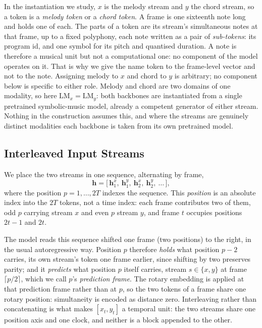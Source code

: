 In the instantiation we study, $x$ is the melody stream and $y$ the
chord stream, so a token is a \emph{melody token} or a \emph{chord
token}. A frame is one sixteenth note long and holds one of each.
The parts of a token are its stream's simultaneous notes at that frame,
up to a fixed polyphony, each note written as a pair of
\emph{sub-tokens}: its program id, and one symbol for its pitch and
quantised duration. A note is
therefore a musical unit but not a computational one: no component of
the model operates on it. That is why we give the name token to the
frame-level vector and not to the note. Assigning melody to $x$ and
chord to $y$ is arbitrary; no component below is specific to either
role. Melody and
chord are two domains of one modality, so here
$\mathrm{LM}_x = \mathrm{LM}_y$: both backbones are instantiated from a
single pretrained symbolic-music model, already a competent generator
of either stream. Nothing in the construction assumes this,
and where the streams are genuinely distinct modalities each backbone
is taken from its own pretrained model.

\subsection{Interleaved Input Streams}
\label{sec:interleave}

We place the two streams in one sequence, alternating by frame,
\begin{equation}
  \mathbf{h}
  = \bigl[\,\mathbf{h}^{x}_1,\ \mathbf{h}^{y}_1,\
            \mathbf{h}^{x}_2,\ \mathbf{h}^{y}_2,\ \dots\,\bigr],
  \label{eq:interleave}
\end{equation}
where the position $p = 1, \dots, 2T$ indexes the sequence. This
\emph{position} is an absolute index into the $2T$ tokens, not a time
index: each frame contributes two of them, odd $p$ carrying stream $x$
and even $p$ stream $y$, and frame $t$ occupies positions $2t{-}1$ and
$2t$.

The model reads this sequence shifted one frame (two positions) to
the right, in the usual autoregressive way. Position $p$ therefore
\emph{holds} what position $p{-}2$ carries, its own stream's token one
frame earlier, since shifting by two preserves parity; and it
\emph{predicts} what position $p$ itself carries, stream
$s \in \{x, y\}$ at frame $\lceil p/2 \rceil$, which we call $p$'s
\emph{prediction frame}. The rotary embedding is applied at that
prediction frame rather than at $p$, so the two tokens of a frame share
one rotary position: simultaneity is encoded as distance zero.
Interleaving rather than concatenating is what makes $[x_t, y_t]$ a
temporal unit: the two streams share one position axis and one clock,
and neither is a block appended to the other.

